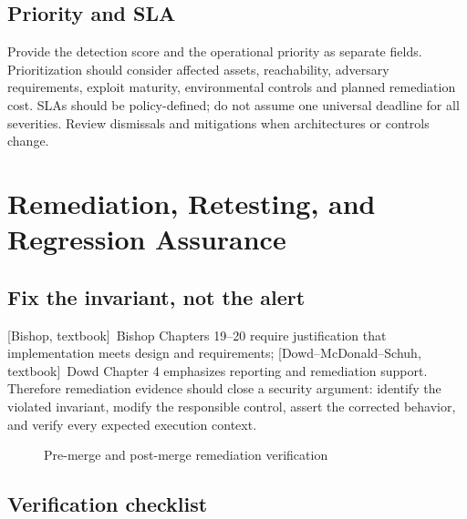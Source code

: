 \documentclass[11pt,letterpaper,oneside]{book}
\newcommand{\srcB}{\textsf{[Bishop, textbook]}}
\newcommand{\srcD}{\textsf{[Dowd--McDonald--Schuh, textbook]}}
\begin{document}
\section{Priority and SLA}

Provide the detection score and the operational priority as separate fields. Prioritization should consider affected assets, reachability, adversary requirements, exploit maturity, environmental controls and planned remediation cost. SLAs should be policy-defined; do not assume one universal deadline for all severities. Review dismissals and mitigations when architectures or controls change.

\chapter{Remediation, Retesting, and Regression Assurance}

\section{Fix the invariant, not the alert}

\srcB\ Bishop Chapters 19--20 require justification that implementation meets design and requirements; \srcD\ Dowd Chapter 4 emphasizes reporting and remediation support. Therefore remediation evidence should close a security argument: identify the violated invariant, modify the responsible control, assert the corrected behavior, and verify every expected execution context.

\begin{figure}[htbp]\centering
{}\caption{Pre-merge and post-merge remediation verification}\end{figure}

\section{Verification checklist}
\end{document}
